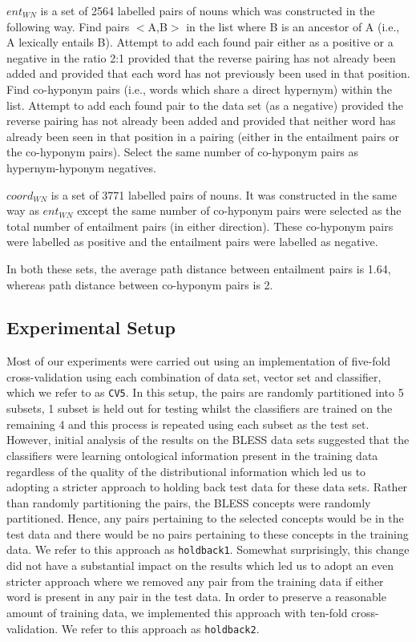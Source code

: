 \documentclass[11pt]{article}
\begin{document}
$ent_{WN}$ is a set of 2564 labelled pairs of nouns which was constructed in the following way.  Find pairs $<$A,B$>$ in the list where B is an ancestor of A (i.e., A lexically entails B).  Attempt to add each found pair either as a positive or a negative in the ratio 2:1 provided that the reverse pairing has not already been added and provided that each word has not previously been used in that position.  Find co-hyponym pairs (i.e., words which share a direct hypernym) within the list.  Attempt to add each found pair to the data set (as a negative) provided the reverse pairing has not already been added and provided that neither word has already been seen in that position in a pairing (either in the entailment pairs or the co-hyponym pairs).  Select the same number of co-hyponym pairs as hypernym-hyponym negatives. 

$coord_{WN}$ is a set of 3771 labelled pairs of nouns.  It was constructed in the same way as $ent_{WN}$ except the same number of co-hyponym pairs were selected as the total number of entailment pairs (in either direction).  These co-hyponym pairs were labelled as positive and the entailment pairs were labelled as negative.

In both these sets, the average path distance between entailment pairs is 1.64, whereas path distance between co-hyponym pairs is 2.

\subsection{Experimental Setup}

Most of our experiments were carried out using an implementation of five-fold cross-validation using each combination of data set, vector set and classifier, which we refer to as \texttt{CV5}.  In this setup, the pairs are randomly partitioned into 5 subsets, 1 subset is held out for testing whilst the classifiers are trained on the remaining 4 and this process is repeated using each subset as the test set.  However, initial analysis of the results on the BLESS data sets suggested that the classifiers were learning ontological information present in the training data regardless of the quality of the distributional information which led us to adopting a stricter approach to holding back test data for these data sets.  Rather than randomly partitioning the pairs, the BLESS concepts were randomly partitioned.  Hence, any pairs pertaining to the selected concepts would be in the test data and there would be no pairs pertaining to these concepts in the training data.  We refer to this approach as \texttt{holdback1}.  Somewhat surprisingly, this change did not have a substantial impact on the results which led us to adopt an even stricter approach where we removed any pair from the training data if either word is present in any pair in the test data.  In order to preserve a reasonable amount of training data, we implemented this approach with ten-fold cross-validation.  We refer to this approach as \texttt{holdback2}.
\end{document}

